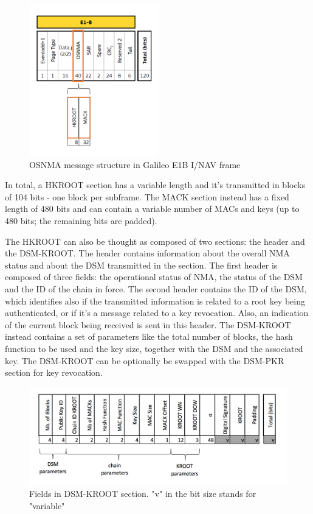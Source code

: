\begin{figure}[h!]
  \begin{center}
    \includegraphics[width=0.5\textwidth]{figures/osnma_fields.png}
  \end{center}
  \caption{OSNMA message structure in Galileo E1B I/NAV frame}
  \label{fig:osnma_fields}
\end{figure}

In total, a HKROOT section has a variable length and it's transmitted in blocks
of 104 bits - one block per subframe. The MACK section instead has a fixed
length of 480 bits and can contain a variable number of MACs and keys (up to 480
bits; the remaining bits are padded).

The HKROOT can also be thought as composed of two sections: the header and the
DSM-KROOT. The header contains information about the overall NMA status and
about the DSM transmitted in the section. The first header is composed of three
fields: the operational status of NMA, the status of the DSM and the ID of the
chain in force. The second header contains the ID of the DSM, which identifies
also if the transmitted information is related to a root key being
authenticated, or if it's a message related to a key revocation. Also, an
indication of the current block being received is sent in this header. The
DSM-KROOT instead contains a set of parameters like the total number of blocks,
the hash function to be used and the key size, together with the DSM and the
associated key. The DSM-KROOT can be optionally be swapped with the DSM-PKR
section for key revocation.

\begin{figure}[h!]
  \includegraphics[width=\linewidth]{figures/dsm_kroot.png}
  \caption{Fields in DSM-KROOT section. "v" in the bit size stands for "variable"}
  \label{fig:dsm_kroot}
\end{figure}


